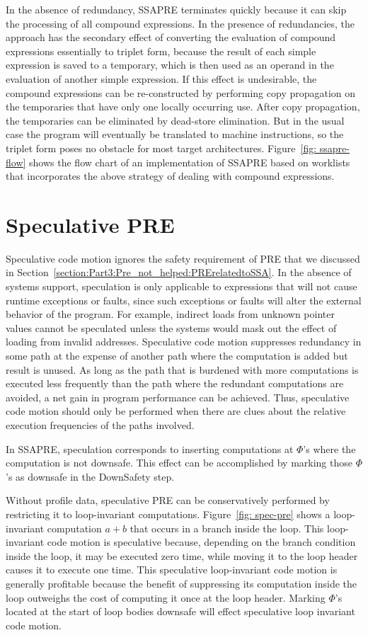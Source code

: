 In the absence of redundancy, SSAPRE terminates quickly because it can skip
the processing of all compound expressions.  In the presence of redundancies,
the approach has the secondary effect of converting the evaluation of compound
expressions essentially to triplet form, because the result of each simple
expression is saved to a temporary, which is then used as an operand in the
evaluation of another simple expression.  If this effect is undesirable,
the compound expressions can be re-constructed by performing copy propagation
on the temporaries that have only one locally occurring use.  After copy
propagation, the temporaries can be eliminated by dead-store elimination.  But
in the usual case the program will eventually be translated to machine
instructions, so the triplet form poses no obstacle for most target 
architectures.  Figure~\ref{fig: ssapre-flow} shows the flow chart of an
implementation of SSAPRE based on worklists that incorporates the above
strategy of dealing with compound expressions.
 
\section{Speculative PRE}

Speculative code motion ignores the safety requirement of PRE that we
discussed in Section~\ref{section:Part3:Pre_not_helped:PRErelatedtoSSA}.
In the absence of systems support, speculation is only applicable to 
expressions that will not cause runtime exceptions or faults, since such
exceptions or faults will alter the external behavior of the program.  
For example, indirect loads from unknown pointer values cannot be speculated
unless the systems would mask out the effect of loading from invalid addresses.
Speculative code motion suppresses
redundancy in some path at the expense of another path where the computation 
is added but result is unused.  As long as the path that is burdened with
more computations is executed less frequently than the path where the
redundant computations are avoided, a net gain in program performance can be
achieved.  Thus, speculative code motion should only be performed when there
are clues about the relative execution frequencies of the paths involved.

In SSAPRE, speculation corresponds to inserting computations at $\Phi$'s where
the computation is not downsafe.  This effect can be accomplished by 
marking those $\Phi$'s as downsafe in the DownSafety step.

Without profile data, speculative PRE can be conservatively performed by
restricting it to loop-invariant computations.  Figure~\ref{fig: spec-pre} shows
a loop-invariant computation $a+b$ that occurs in a branch inside the loop.
This loop-invariant code motion is speculative because, depending on the
branch condition inside the loop, it may be executed zero time, while moving it
to the loop header causes it to execute one time. This speculative 
loop-invariant code motion is generally profitable because the benefit of
suppressing its computation inside the loop outweighs the cost of computing it
once at the loop header.  Marking $\Phi$'s located at the start of loop bodies
downsafe will effect speculative loop invariant code motion\cite{Lo98}. 

